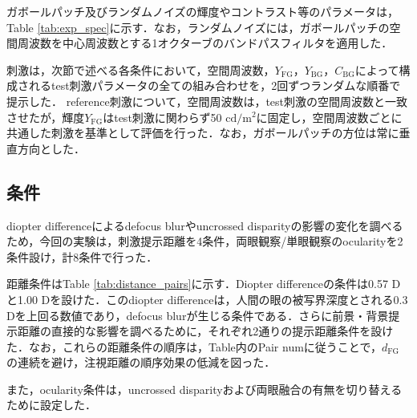 \documentclass[a4j,10pt,fleqn]{rinkoj}
\begin{document}
ガボールパッチ及びランダムノイズの輝度やコントラスト等のパラメータは，Table \ref{tab:exp_spec}に示す．なお，ランダムノイズには，ガボールパッチの空間周波数を中心周波数とする1オクターブのバンドパスフィルタを適用した．

刺激は，次節で述べる各条件において，空間周波数，$Y_{\mathrm{FG}}$，$Y_{\mathrm{BG}}$，$C_{\mathrm{BG}}$によって構成されるtest刺激パラメータの全ての組み合わせを，2回ずつランダムな順番で提示した．
reference刺激について，空間周波数は，test刺激の空間周波数と一致させたが，輝度$Y_{\mathrm{FG}}$はtest刺激に関わらず50 $\mathrm{cd/m^2}$に固定し，空間周波数ごとに共通した刺激を基準として評価を行った．なお，ガボールパッチの方位は常に垂直方向とした．

\subsection{条件}
diopter differenceによるdefocus blurやuncrossed disparityの影響の変化を調べるため，今回の実験は，刺激提示距離を4条件，両眼観察/単眼観察のocularityを2条件設け，計8条件で行った．

距離条件はTable \ref{tab:distance_pairs}に示す．Diopter differenceの条件は0.57 Dと1.00 Dを設けた．このdiopter differenceは，人間の眼の被写界深度とされる0.3 Dを上回る数値であり，defocus blurが生じる条件である\cite{Campbe1957DoF}．さらに前景・背景提示距離の直接的な影響を調べるために，それぞれ2通りの提示距離条件を設けた．なお，これらの距離条件の順序は，Table内のPair numに従うことで，$d_{\mathrm{FG}}$の連続を避け，注視距離の順序効果の低減を図った．

また，ocularity条件は，uncrossed disparityおよび両眼融合の有無を切り替えるために設定した．

\begin{table}[t]
\centering
\caption{Stimulus presentation distances and diopter differences}
\label{tab:distance_pairs}
\end{table}
\end{document}
